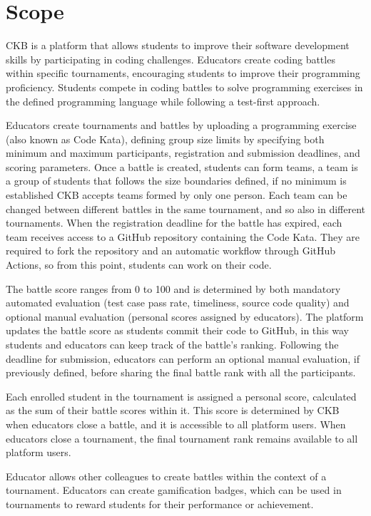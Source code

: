 \section{Scope}
CKB is a platform that allows students to improve their software development skills by participating in coding challenges.
Educators create coding battles within specific tournaments, encouraging students to improve their programming proficiency.
Students compete in coding battles to solve programming exercises in the defined programming language while following a test-first approach.

Educators create tournaments and battles by uploading a programming exercise (also known as Code Kata), defining group size limits by specifying both minimum and maximum participants, registration and submission deadlines, and scoring parameters.
Once a battle is created, students can form teams, a team is a group of students that follows the size boundaries defined, if no minimum is established CKB accepts teams formed by only one person.
Each team can be changed between different battles in the same tournament, and so also in different tournaments.
When the registration deadline for the battle has expired, each team receives access to a GitHub repository containing the Code Kata.
They are required to fork the repository and an automatic workflow through GitHub Actions, so from this point, students can work on their code.

The battle score ranges from 0 to 100 and is determined by both mandatory automated evaluation (test case pass rate, timeliness, source code quality) and optional manual evaluation (personal scores assigned by educators).
The platform updates the battle score as students commit their code to GitHub, in this way students and educators can keep track of the battle's ranking.
Following the deadline for submission, educators can perform an optional manual evaluation, if previously defined, before sharing the final battle rank with all the participants.

Each enrolled student in the tournament is assigned a personal score, calculated as the sum of their battle scores within it.
This score is determined by CKB when educators close a battle, and it is accessible to all platform users.
When educators close a tournament, the final tournament rank remains available to all platform users.

Educator allows other colleagues to create battles within the context of a tournament.
Educators can create gamification badges, which can be used in tournaments to reward students for their performance or achievement.

